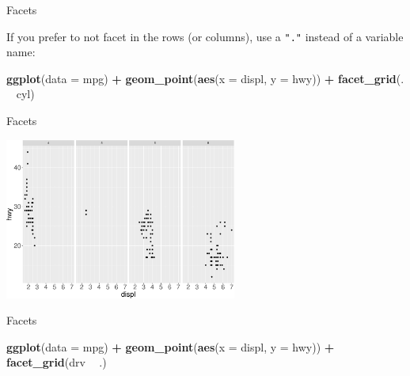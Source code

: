 \documentclass[ignorenonframetext,]{beamer}
\newenvironment{Shaded}{\begin{snugshade}}{\end{snugshade}}
\newcommand{\DataTypeTok}[1]{\textcolor[rgb]{0.13,0.29,0.53}{#1}}
\newcommand{\KeywordTok}[1]{\textcolor[rgb]{0.13,0.29,0.53}{\textbf{#1}}}
\newcommand{\NormalTok}[1]{#1}
\newcommand{\OperatorTok}[1]{\textcolor[rgb]{0.81,0.36,0.00}{\textbf{#1}}}
\newcommand{\StringTok}[1]{\textcolor[rgb]{0.31,0.60,0.02}{#1}}
\begin{document}
\begin{frame}[fragile]{Facets}
\protect\hypertarget{facets-7}{}

If you prefer to not facet in the rows (or columns), use a \texttt{"."}
instead of a variable name:

\begin{Shaded}
\begin{Highlighting}[]
\KeywordTok{ggplot}\NormalTok{(}\DataTypeTok{data =}\NormalTok{ mpg) }\OperatorTok{+}\StringTok{ }
\StringTok{  }\KeywordTok{geom_point}\NormalTok{(}\KeywordTok{aes}\NormalTok{(}\DataTypeTok{x =}\NormalTok{ displ, }\DataTypeTok{y =}\NormalTok{ hwy)) }\OperatorTok{+}\StringTok{ }
\StringTok{  }\KeywordTok{facet_grid}\NormalTok{(. }\OperatorTok{~}\StringTok{ }\NormalTok{cyl)}
\end{Highlighting}
\end{Shaded}

\end{frame}

\begin{frame}{Facets}
\protect\hypertarget{facets-8}{}

\begin{center}\includegraphics[height=200px]{data-visualization_files/figure-beamer/unnamed-chunk-77-1} \end{center}

\end{frame}

\begin{frame}[fragile]{Facets}
\protect\hypertarget{facets-9}{}

\begin{Shaded}
\begin{Highlighting}[]
\KeywordTok{ggplot}\NormalTok{(}\DataTypeTok{data =}\NormalTok{ mpg) }\OperatorTok{+}\StringTok{ }
\StringTok{  }\KeywordTok{geom_point}\NormalTok{(}\KeywordTok{aes}\NormalTok{(}\DataTypeTok{x =}\NormalTok{ displ, }\DataTypeTok{y =}\NormalTok{ hwy)) }\OperatorTok{+}
\StringTok{  }\KeywordTok{facet_grid}\NormalTok{(drv }\OperatorTok{~}\StringTok{ }\NormalTok{.)}
\end{Highlighting}
\end{Shaded}

\end{frame}
\end{document}
